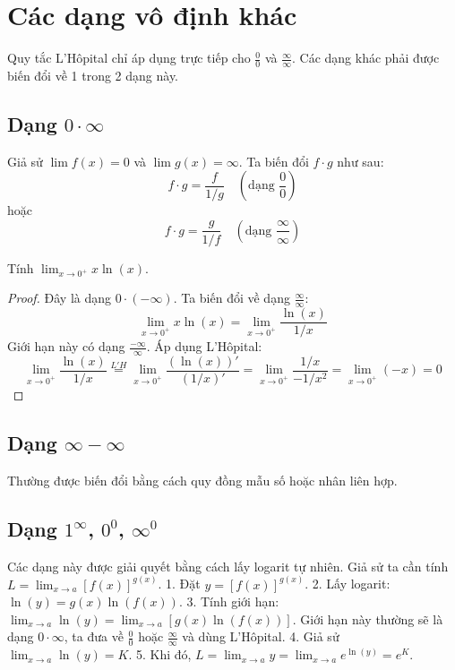 \section{Các dạng vô định khác}

Quy tắc L'Hôpital chỉ áp dụng trực tiếp cho $\frac{0}{0}$ và $\frac{\infty}{\infty}$. Các dạng khác phải được biến đổi về 1 trong 2 dạng này.

\subsection{\texorpdfstring{Dạng $0 \cdot \infty$}{Dạng 0 * Vô cực}}
Giả sử $\lim f(x) = 0$ và $\lim g(x) = \infty$. Ta biến đổi $f \cdot g$ như sau:
$$ f \cdot g = \frac{f}{1/g} \quad (\text{dạng } \frac{0}{0}) $$
hoặc
$$ f \cdot g = \frac{g}{1/f} \quad (\text{dạng } \frac{\infty}{\infty}) $$

\begin{example}
Tính $\lim_{x \to 0^+} x \ln(x)$.
\begin{proof}
Đây là dạng $0 \cdot (-\infty)$. Ta biến đổi về dạng $\frac{\infty}{\infty}$:
$$ \lim_{x \to 0^+} x \ln(x) = \lim_{x \to 0^+} \frac{\ln(x)}{1/x} $$
Giới hạn này có dạng $\frac{-\infty}{\infty}$. Áp dụng L'Hôpital:
$$ \lim_{x \to 0^+} \frac{\ln(x)}{1/x} \overset{L'H}{=} \lim_{x \to 0^+} \frac{(\ln(x))'}{(1/x)'} = \lim_{x \to 0^+} \frac{1/x}{-1/x^2} = \lim_{x \to 0^+} (-x) = 0 $$
\end{proof}
\end{example}

\subsection{\texorpdfstring{Dạng $\infty - \infty$}{Dạng Vô cực - Vô cực}}
Thường được biến đổi bằng cách quy đồng mẫu số hoặc nhân liên hợp.

\subsection{Dạng \texorpdfstring{$1^\infty$}{1^Inf}, \texorpdfstring{$0^0$}{0^0}, \texorpdfstring{$\infty^0$}{Inf^0}}
Các dạng này được giải quyết bằng cách lấy logarit tự nhiên.
Giả sử ta cần tính $L = \lim_{x \to a} [f(x)]^{g(x)}$.
1. Đặt $y = [f(x)]^{g(x)}$.
2. Lấy logarit: $\ln(y) = g(x) \ln(f(x))$.
3. Tính giới hạn: $\lim_{x \to a} \ln(y) = \lim_{x \to a} [g(x) \ln(f(x))]$.
   Giới hạn này thường sẽ là dạng $0 \cdot \infty$, ta đưa về $\frac{0}{0}$ hoặc $\frac{\infty}{\infty}$ và dùng L'Hôpital.
4. Giả sử $\lim_{x \to a} \ln(y) = K$.
5. Khi đó, $L = \lim_{x \to a} y = \lim_{x \to a} e^{\ln(y)} = e^K$.

